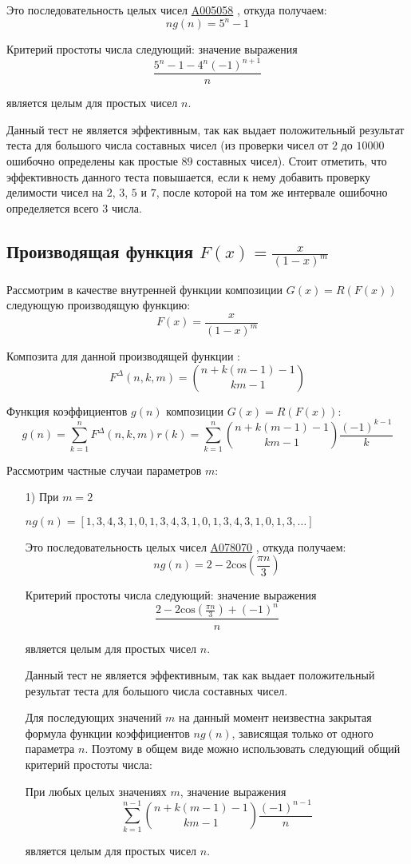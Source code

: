 \documentclass[
russian,
cp1251,
14pt,
simple
]{eskdtext}
\theoremstyle{definition}
\begin{document}
\begin{itemize}
Это последовательность целых чисел \href{http://oeis.org/A005058}{A005058} \cite{oeis}, откуда получаем:
$$
ng(n)=5^n - 1
$$

Критерий простоты числа следующий: значение выражения
$$
\frac{5^n - 1 - 4^n(-1)^{n + 1}}{n}
$$

является целым для простых чисел $n$.

Данный тест не является эффективным, так как выдает положительный результат теста для большого числа составных чисел (из проверки чисел от $2$ до $10000$ ошибочно определены как простые $89$ составных чисел). Стоит отметить, что эффективность данного теста повышается, если к нему добавить проверку делимости чисел на $2$, $3$, $5$ и $7$, после которой на том же интервале ошибочно определяется всего $3$ числа.


\end{itemize}

\subsection{Производящая функция $F(x)=\frac{x}{(1-x)^m}$}
Рассмотрим в качестве внутренней функции композиции $G(x)=R(F(x))$ следующую производящую функцию:
$$
F(x)=\frac{x}{(1-x)^m}
$$

Композита для данной производящей функции \cite{KruchininVV}:
$$
F^\Delta(n,k,m)={n+k(m-1)-1 \choose km-1}
$$

Функция коэффициентов $g(n)$ композиции $G(x)=R(F(x))$:
$$
g(n)=\sum^{n}_{k=1}{F^\Delta(n,k,m)r(k)}=\sum^{n}_{k=1}{{n+k(m-1)-1 \choose km-1}\frac{(-1)^{k-1}}{k}}
$$

Рассмотрим частные случаи параметров $m$:
\begin{itemize}
\item[1)] При $m=2$

\begin{math}
ng(n)=[1,3,4,3,1,0,1,3,4,3,1,0,1,3,4,3,1,0,1,3,\ldots]
\end{math}

Это последовательность целых чисел \href{http://oeis.org/A078070}{A078070} \cite{oeis}, откуда получаем:
$$
ng(n)=2-2\mathrm{cos}(\frac{\pi n}{3})
$$

Критерий простоты числа следующий: значение выражения
$$
\frac{2-2\mathrm{cos}(\frac{\pi n}{3})+(-1)^n}{n}
$$

является целым для простых чисел $n$.

Данный тест не является эффективным, так как выдает положительный результат теста для большого числа составных чисел.

Для последующих значений $m$ на данный момент неизвестна закрытая формула функции коэффициентов $ng(n)$, зависящая только от одного параметра $n$. Поэтому в общем виде можно использовать следующий общий критерий простоты числа:

При любых целых значениях $m$, значение выражения
$$
\sum^{n-1}_{k=1}{{n+k(m-1)-1 \choose km-1}\frac{(-1)^{n-1}}{n}}
$$

является целым для простых чисел $n$.

\end{itemize}
\end{document}
